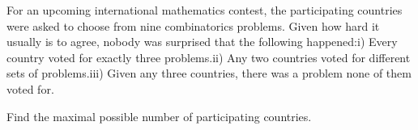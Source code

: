 For an upcoming international mathematics contest, the participating countries were asked to choose from nine combinatorics problems. Given how hard it usually is to agree, nobody was surprised that the following happened:i) Every country voted for exactly three problems.ii) Any two countries voted for different sets of problems.iii) Given any three countries, there was a problem none of them voted for.

Find the maximal possible number of participating countries.